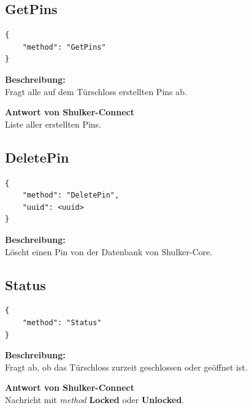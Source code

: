 \subsection{GetPins}
\begin{lstlisting}
{
    "method": "GetPins"
}
\end{lstlisting}

\textbf{Beschreibung:} \\
Fragt alle auf dem Türschloss erstellten Pins ab.

\textbf{Antwort von Shulker-Connect} \\
Liste aller erstellten Pins.



\subsection{DeletePin}
\begin{lstlisting}
{
    "method": "DeletePin",
    "uuid": <uuid>
}
\end{lstlisting}

\textbf{Beschreibung:} \\
Löscht einen Pin von der Datenbank von Shulker-Core.



\subsection{Status}
\begin{lstlisting}
{
    "method": "Status"
}
\end{lstlisting}

\textbf{Beschreibung:} \\
Fragt ab, ob das Türschloss zurzeit geschlossen oder geöffnet ist.

\textbf{Antwort von Shulker-Connect} \\
Nachricht mit \textit{method} \textbf{Locked} oder \textbf{Unlocked}.